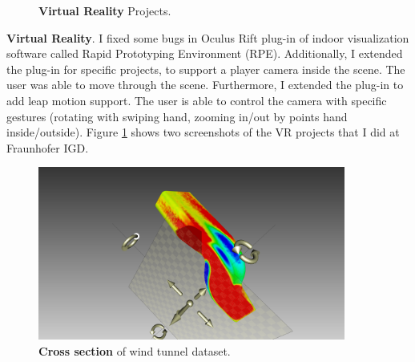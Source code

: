 \documentclass[]{report}
\begin{document}
\begin{figure}[!ht]
	\hfill
	\caption[Virtual Reality]{\textbf{Virtual Reality} Projects.}
	\label{fig:VR}
\end{figure}

\textbf{Virtual Reality}. I fixed some bugs in Oculus Rift plug-in of indoor visualization software called Rapid Prototyping Environment (RPE). Additionally, I extended the plug-in for specific projects, to support a player camera inside the scene. The user was able to move through the scene. Furthermore, I extended the plug-in to add leap motion support. The user is able to control the camera with specific gestures (rotating with swiping hand, zooming in/out by points hand inside/outside). Figure \ref{fig:VR} shows two screenshots of the VR projects that I did at Fraunhofer IGD. 

\begin{figure}[!ht]
	\centering
	\includegraphics[width=0.90\textwidth]{./figs/crosssection.png}
	\caption[Cross section]{\textbf{Cross section} of wind tunnel dataset.}
	\label{fig:crossection}
\end{figure}
\end{document}
